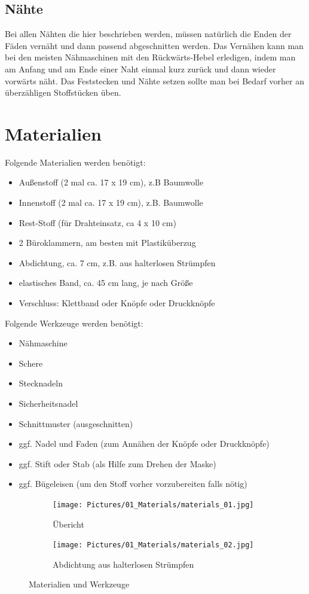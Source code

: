\documentclass[12pt,parskip=full]{scrartcl}
\begin{document}
\subsection*{Nähte}
Bei allen Nähten die hier beschrieben werden, müssen natürlich die Enden der Fäden vernäht und dann passend abgeschnitten werden. Das Vernähen kann man bei den meisten Nähmaschinen mit den Rückwärts-Hebel erledigen, indem man am Anfang und am Ende einer Naht einmal kurz zurück und dann wieder vorwärts näht. Das Feststecken und Nähte setzen sollte man bei Bedarf vorher an überzähligen Stoffstücken üben.

\section*{Materialien}
Folgende Materialien werden benötigt:
\begin{itemize}
    \item Außenstoff (2 mal ca. 17 x 19 cm), z.B Baumwolle
    \item Innenstoff (2 mal ca. 17 x 19 cm), z.B. Baumwolle
    \item Rest-Stoff (für Drahteinsatz, ca 4 x 10 cm)
    \item 2 Büroklammern, am besten mit Plastiküberzug
    \item Abdichtung, ca. 7 cm, z.B. aus halterlosen Strümpfen
    \item elastisches Band, ca. 45 cm lang, je nach Größe
    \item Verschluss: Klettband oder Knöpfe oder Druckknöpfe
\end{itemize}

Folgende Werkzeuge werden benötigt:
\begin{itemize}
    \item Nähmaschine
    \item Schere
    \item Stecknadeln
    \item Sicherheitsnadel
    \item Schnittmuster (ausgeschnitten)
    \item ggf. Nadel und Faden (zum Annähen der Knöpfe oder Druckknöpfe)
    \item ggf. Stift oder Stab (als Hilfe zum Drehen der Maske)
    \item ggf. Bügeleisen (um den Stoff vorher vorzubereiten falls nötig)
\end{itemize}

\clearpage

\begin{figure}[h]
    \vspace{0.5cm}
    \centering
    \begin{subfigure}{0.48\textwidth}
        \centering
        \texttt{[image: Pictures/01\_Materials/materials\_01.jpg]}
        \caption{Übericht}
    \end{subfigure}
    \begin{subfigure}{0.48\textwidth}
        \centering
        \texttt{[image: Pictures/01\_Materials/materials\_02.jpg]}
        \caption{Abdichtung aus halterlosen Strümpfen}
    \end{subfigure}
    \caption{Materialien und Werkzeuge}
\end{figure}
\end{document}
